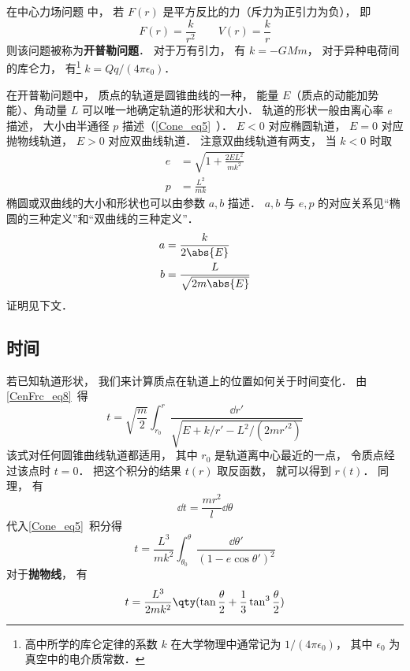 
在中心力场问题 中， 若 $F(r)$ 是平方反比的力（斥力为正引力为负）， 即
\begin{equation}
F(r) = \frac{k}{r^2}  \qquad V(r) = \frac{k}{r}
\end{equation}
则该问题被称为\textbf{开普勒问题}． 对于万有引力， 有 $k = -GMm$， 对于异种电荷间的库仑力， 有\footnote{高中所学的库仑定律的系数 $k$ 在大学物理中通常记为 $1/(4\pi\epsilon_0)$， 其中 $\epsilon_0$ 为真空中的电介质常数．} $k = Qq/(4\pi\epsilon_0)$．

在开普勒问题中， 质点的轨道是圆锥曲线的一种， 能量 $E$（质点的动能加势能）、角动量 $L$ 可以唯一地确定轨道的形状和大小． 轨道的形状一般由离心率 $e$ 描述， 大小由半通径 $p$ 描述（\autoref{Cone_eq5}~）． $E < 0$ 对应椭圆轨道， $E = 0$ 对应抛物线轨道， $E > 0$ 对应双曲线轨道． 注意双曲线轨道有两支， 当 $k < 0$ 时取
\begin{align}
e &= \sqrt{1 + \frac{2EL^2}{mk^2}}\label{CelBd_eq2}\\
p &= \frac{L^2}{mk}\label{CelBd_eq3}
\end{align}
椭圆或双曲线的大小和形状也可以由参数 $a,b$ 描述． $a,b$ 与 $e,p$ 的对应关系见“椭圆的三种定义”和“双曲线的三种定义”．
\begin{align}
a &= \frac{k}{2\abs{E}}\label{CelBd_eq7}\\
b &= \frac{L}{\sqrt{2m\abs{E}}}\label{CelBd_eq8}
\end{align}
证明见下文．

\subsection{时间}
若已知轨道形状， 我们来计算质点在轨道上的位置如何关于时间变化． 由\autoref{CenFrc_eq8}~得
\begin{equation}
t = \sqrt{\frac{m}{2}} \int_{r_0}^r \frac{\dd{r'}}{\sqrt{E + k/r' - L^2/(2mr'^2)}}
\end{equation}
该式对任何圆锥曲线轨道都适用， 其中 $r_0$ 是轨道离中心最近的一点， 令质点经过该点时 $t= 0$． 把这个积分的结果 $t(r)$ 取反函数， 就可以得到 $r(t)$． 同理， 有
\begin{equation}
\dd{t} = \frac{mr^2}{l}\dd{\theta}
\end{equation}
代入\autoref{Cone_eq5}~积分得
\begin{equation}
t = \frac{L^3}{mk^2} \int_{\theta_0}^\theta \frac{\dd{\theta'}}{(1 - e\cos \theta')^2 }
\end{equation}
对于\textbf{抛物线}， 有
\begin{equation}
t = \frac{L^3}{2mk^2} \qty(\tan\frac{\theta}{2} +  \frac{1}{3}\tan^3 \frac{\theta}{2})
\end{equation}


